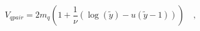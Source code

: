 \begin{equation}
V_{qpair} = 2 m_q\left(1 + \frac{1}{\nu}\left(\log(\tilde{y}) -
u(\tilde{y}-1)\right)\right)\quad,
\end{equation}

